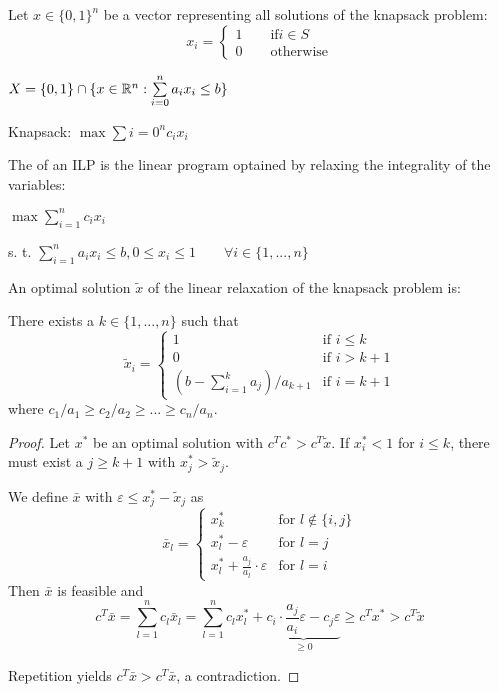 Let $x \in \{0,1\}^n$ be a vector representing all solutions of the knapsack problem:
\[
	x_i = \begin{cases}
		1 \qquad \text{if} i \in S \\
		0 \qquad \text{otherwise}
	\end{cases}
\]

$X = \{0,1\} \cap \{ x \in \mathbb{R}^n: \sum\limits_{i = 0}^n a_ix_i\leq b\}$

Knapsack: $\max \sum{i = 0}^n c_i x_i$

The  of an ILP is the linear program optained by relaxing the integrality of the variables:

$\max \sum_{i=1}^n c_i x_i$

s. t. $\sum_{i=1}^n a_i x_i \leq b, 0 \leq x_i \leq 1 \qquad \forall i \in \{1, ..., n\}$

\begin{thm}
An optimal solution $\tilde{x}$ of the linear relaxation of the knapsack
problem is:

There exists a $k \in \{1, ..., n\}$ such that 
\[
\tilde{x}_i = \left \{ \begin{array}{ll}
1 & \text{if } i \leq k \\ 
0 & \text{if } i > k+1 \\
(b-\sum^k_{i=1} a_j) / a_{k+1} & \text{if } i=k+1
\end{array} \right.
\]
where $c_1/a_1 \geq c_2 / a_2 \geq ... \geq c_n / a_n$.
\end{thm}

\begin{proof}
Let $x^*$ be an optimal solution with $c^T c^* > c^T \tilde{x}$.
If $x^*_i < 1$ for $i \leq k$, there must exist a $j \geq k+1$ with $x^*_j >
\tilde{x}_j$.

We define $\bar{x}$ with $\varepsilon \leq x^*_j - \tilde{x}_j$ as
\[
\bar{x}_l = \left \{ \begin{array}{ll}
x^*_k & \text{for } l \not\in \{i, j\} \\
x^*_l - \varepsilon & \text{for } l=j \\
x^*_l + \frac{a_j}{a_l} \cdot \varepsilon & \text{for } l=i
\end{array} \right.
\]
Then $\bar{x}$ is feasible and
\[
c^T \bar{x} = \sum_{l=1}^n c_l \bar{x}_l =
\sum_{l=1}^n c_l x^*_l + \underbrace{c_i \cdot \frac{a_j}{a_i} \varepsilon - c_j
\varepsilon}_{\geq 0} \geq c^T x^* > c^T \tilde{x}
\]

Repetition yields $c^T \bar{x} > c^T \bar{x}$, a contradiction.
\end{proof}


